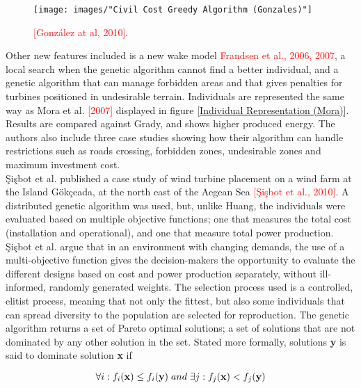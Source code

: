 \begin{figure}[h!]
\begin{center}
\texttt{[image: images/"Civil Cost Greedy Algorithm (Gonzales)"]}
\caption{ \textcolor{red}{[González at al, 2010]}.}
\label{Civil Cost Greedy Algorithm (Gonzales)}
\end{center}
\end{figure}


\noindent Other new features included is a new wake model \textcolor{red}{Frandsen et al., 2006, 2007}, a local search when the genetic algorithm cannot find a better individual, and a genetic algorithm that can manage forbidden areas and that gives penalties for turbines positioned in undesirable terrain. Individuals are represented the same way as Mora et al. \textcolor{red}{[2007]} displayed in figure \ref{Individual Representation (Mora)}. Results are compared against Grady, and shows higher produced energy. The authors also include three case studies showing how their algorithm can handle restrictions such as roads crossing, forbidden zones, undesirable zones and maximum investment cost.\\


\noindent \c{S}i\c{s}bot et al. published a case study of wind turbine placement on a wind farm at the Island G{\"o}k\c{c}eada, at the north east of the Aegean Sea \textcolor{red}{[\c{S}i\c{s}bot et al., 2010]}. A distributed genetic algorithm was used, but, unlike Huang, the individuals were evaluated based on multiple objective functions; one that measures the total cost (installation and operational), and one that measure total power production. \c{S}i\c{s}bot et al. argue that in an environment with changing demands, the use of a multi-objective function gives the decision-makers the opportunity to evaluate the different designs based on cost and power production separately, without ill-informed, randomly generated weights. The selection process used is a controlled, elitist process, meaning that not only the fittest, but also some individuals that can spread diversity to the population are selected for reproduction. The genetic algorithm returns a set of Pareto optimal solutions; a set of solutions that are not dominated by any other solution in the set. Stated more formally, solutions \textbf{y} is said to dominate solution \textbf{x} if

\begin{equation}
\forall i: f_i(\textbf{x}) \leq f_i(\textbf{y}) \hspace{1mm} and \hspace{1mm} \exists j: f_j(\textbf{x}) < f_j(\textbf{y}) 
\label{Dominated solutions}
\end{equation}

